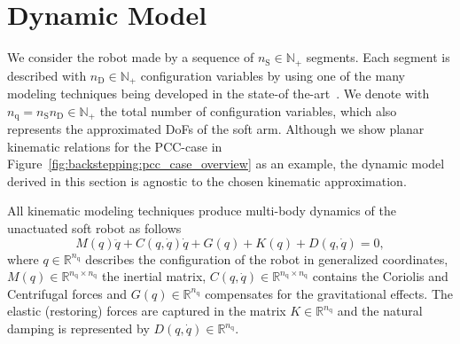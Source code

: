 \section{Dynamic Model}\label{sec:backstepping:dynamic_model}

We consider the robot made by a sequence of $n_{\mathrm{S}} \in \mathbb{N}_+$ segments. Each segment is described with $n_{\mathrm{D}} \in \mathbb{N}_+$ configuration variables by using one of the many modeling techniques being developed in the state-of the-art~\citep {faure2012sofa, grazioso2019geometrically, sadati2021tmtdyn, boyer2020dynamics}.
%
We denote with $n_{\mathrm{q}} = n_{\mathrm{S}} n_{\mathrm{D}}  \in \mathbb{N}_+$ the total number of configuration variables, which also represents the approximated DoFs of the soft arm.
%
Although we show planar kinematic relations for the \gls{PCC}-case in Figure~\ref{fig:backstepping:pcc_case_overview} as an example, the dynamic model derived in this section is agnostic to the chosen kinematic approximation.
%

All kinematic modeling techniques produce multi-body dynamics of the unactuated soft robot as follows~\citep{della2023model}
%
\begin{equation}
	M(q)\ddot{q} + C(q,\dot{q}) \dot{q} + G(q) + K(q) + D(q, \dot{q}) = 0,
\end{equation}
%
where $q \in \mathbb{R}^{n_{\mathrm{q}}}$ describes the configuration of the robot in generalized coordinates, $M(q) \in \mathbb{R}^{n_{\mathrm{q}} \times n_{\mathrm{q}}}$ the inertial matrix, $C(q,\dot{q}) \in \mathbb{R}^{n_{\mathrm{q}} \times n_{\mathrm{q}}}$ contains the Coriolis and Centrifugal forces and $G(q) \in \mathbb{R}^{n_{\mathrm{q}}}$ compensates for the gravitational effects. The elastic (restoring) forces are captured in the matrix $K \in \mathbb{R}^{n_{\mathrm{q}}}$ and the natural damping is represented by $D(q,\dot{q}) \in \mathbb{R}^{n_{\mathrm{q}}}$.

